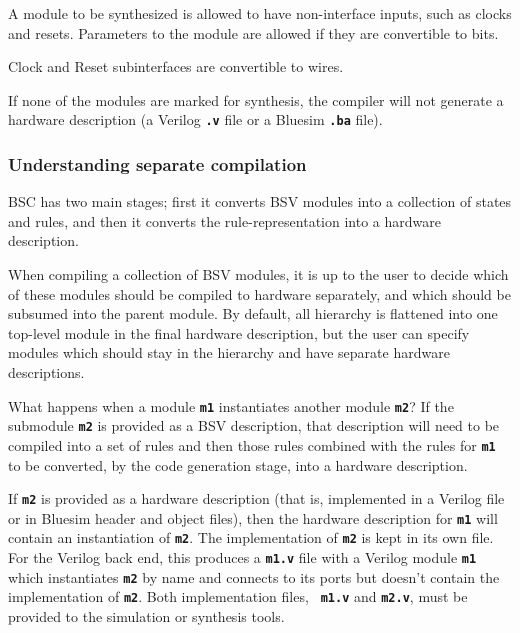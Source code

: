 \documentclass{article}
\newcommand{\te}[1]{\texttt{#1}}
\begin{document}
A module to be synthesized is allowed to have non-interface inputs,
such as clocks and resets.  Parameters to the module are allowed
if they are convertible to bits.

Clock and Reset subinterfaces are convertible to wires.

If none of the  modules are marked for
synthesis, the compiler will not generate a hardware description (a
Verilog {\bf\tt .v} file  or a Bluesim {\bf\tt .ba} file).


\subsubsection{Understanding separate compilation}
\label{sep-compile}

BSC has two main stages; first it converts BSV modules
into a collection of states and rules, and then it converts the
rule-representation into a hardware description.

When compiling a collection of BSV modules, it is up to the user to
decide which of these modules should be compiled to hardware
separately, and which should be subsumed into the parent module.  By
default, all hierarchy is flattened into one top-level module in the
final hardware description, but the user can specify   modules which should
stay in the hierarchy and
have separate hardware descriptions.

 What happens when
a module {\bf\tt m1} instantiates another module {\bf\tt m2}?
If the submodule {\bf\tt m2} is provided as a BSV
description, that description will need to be compiled into a set of
rules and then those rules combined with the rules for {\bf\tt m1} to
be converted, by the code generation stage, into a  hardware
description.

If {\bf\tt m2} is provided as a hardware
description (that is, implemented in a Verilog file or in Bluesim header and
object files), then the hardware description for {\bf\tt m1} will
contain an instantiation of {\bf\tt m2}.  The implementation of
{\bf\tt m2} is kept in its own file.
For the Verilog back end, this produces a {\bf\tt m1.v}
file with a Verilog module {\bf\tt m1} which instantiates {\bf\tt m2}
by name and connects to its ports but doesn't contain the
implementation of {\bf\tt m2}. Both implementation files, {\bf\tt
m1.v} and {\bf\tt m2.v}, must be provided to the simulation or
synthesis tools.

\index{-g@\te{-g} (compiler flag)}
\end{document}
